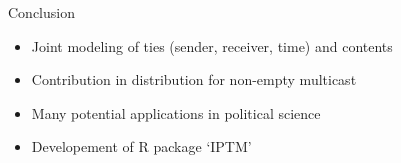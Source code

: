 \documentclass[10pt, xcolor=table]{beamer}
\def\bni{\begin{itemize}} \def\ei{\end{itemize}}
\theoremstyle{definition}
\theoremstyle{remark}
\begin{document}
\begin{frame}{Conclusion}
 \bni
 \item Joint modeling of ties (sender, receiver, time) and contents
 	\vspace{0.4cm}
 \item Contribution in distribution for non-empty multicast
 	\vspace{0.4cm}
 \item Many potential applications in political science
 	\vspace{0.4cm}
 	\item Developement of R package `IPTM'
 \ei
\end{frame}
\end{document}
